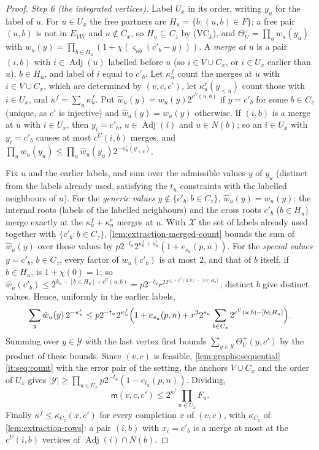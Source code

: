 \begin{proof}
\emph{Step 6 (the integrated vertices).} Label $U_x$ in its order, writing $y_u$ for
the label of $u$. For $u\in U_x$ the free partners are $H_u=\{b:(u,b)\in F\}$; a free
pair $(u,b)$ is not in $E_{VW}$ and $u\notin C_x$, so $H_u\subseteq C_z$ by (VC$_k$),
and
$\Theta^+_U=\prod_uw_u(y_u)$ with
$w_u(y)=\prod_{b\in H_u}(1+\chi(\varsigma_{ub}(c'_b-y)))$. A \emph{merge at $u$} is a
pair $(i,b)$ with $i\in\operatorname{Adj}(u)$ labelled before $u$ (so $i\in V\cup
C_x$, or $i\in U_x$ earlier than $u$), $b\in H_u$, and label of $i$ equal to
$c'_b$. Let $\kappa^f_u$ count the merges at $u$ with $i\in V\cup C_x$, which are
determined by $(v,c,c')$, let $\kappa^r_u(y_{<u})$ count those with $i\in U_x$, and
$\kappa^f=\sum_u\kappa^f_u$. Put $\hat w_u(y)=w_u(y)2^{c^U(u,b)}$ if $y=c'_b$ for
some $b\in C_z$ (unique, as $c'$ is injective) and $\hat w_u(y)=w_u(y)$ otherwise.
If $(i,b)$ is a merge at $u$ with $i\in U_x$, then $y_i=c'_b$,
$u\in\operatorname{Adj}(i)$ and $u\in N(b)$; so an $i\in U_x$ with $y_i=c'_b$
causes at most $c^U(i,b)$ merges, and
$\prod_uw_u(y_u)\le\prod_u\hat w_u(y_u)2^{-\kappa^r_u(y_{<u})}$.

Fix $u$ and the earlier labels, and sum over the admissible values $y$ of $y_u$
(distinct from the labels already used, satisfying the $t_u$ constraints with the
labelled neighbours of $u$). For the \emph{generic values}
$y\notin\{c'_b:b\in C_z\}$, $\hat w_u(y)=w_u(y)$; the internal roots (labels of
the labelled neighbours) and the cross roots $c'_b$ ($b\in H_u$) merge exactly at
the $\kappa^f_u+\kappa^r_u$ merges at $u$. With $\mathcal X$ the set of labels
already used together with $\{c'_b:b\in C_z\}$, \cref{lem:extraction-merged-count}
bounds the sum of $\hat w_u(y)$ over these values by
$p2^{-t_u}2^{\kappa^f_u+\kappa^r_u}(1+e_{s_u}(p,n))$.
For the \emph{special values} $y=c'_b$, $b\in C_z$, every factor of $w_u(c'_b)$ is at
most $2$, and that of $b$ itself, if $b\in H_u$, is $1+\chi(0)=1$; so
$\hat w_u(c'_b)\le2^{h_u-[b\in H_u]+c^U(u,b)}=p2^{-t_u}r^22^{s_u+c^U(u,b)-[b\in H_u]}$;
distinct $b$ give distinct values. Hence, uniformly in the earlier labels,
\[
 \sum_y\hat w_u(y)\,2^{-\kappa^r_u}\le p2^{-t_u}2^{\kappa^f_u}
 \Bigl(1+e_{s_u}(p,n)+r^22^{s_u}\sum_{b\in C_z}2^{c^U(u,b)-[b\in H_u]}\Bigr).
\]
Summing over $y\in\mathcal Y$ with the last vertex first bounds
$\sum_{y\in\mathcal Y}\Theta^+_U(y,c')$ by the product of these bounds. Since $(v,c)$
is feasible, \cref{lem:graphs:sequential}\ref{it:seq:count} with the error pair of the
setting, the anchors $V\cup C_x$ and the order of $U_x$ gives
$|\mathcal Y|\ge\prod_{u\in U_x}p2^{-t_u}(1-e_{t_u}(p,n))$. Dividing,
\begin{equation}\label{eq:extraction:mbound}
 \mathsf m(v,c,c')\le2^{\kappa^f}\prod_{u\in U_x}F_u .
\end{equation}
Finally $\kappa^f\le\kappa_{C_z}(x,c')$ for every completion $x$ of $(v,c)$, with
$\kappa_{C_z}$ of \cref{lem:extraction-rows}: a pair $(i,b)$ with $x_i=c'_b$ is a
merge at most at the $c^U(i,b)$ vertices of $\operatorname{Adj}(i)\cap N(b)$.


\end{proof}
